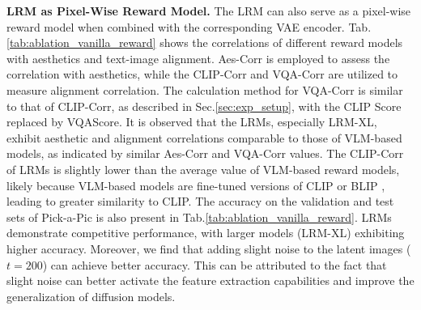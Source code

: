 \textbf{LRM as Pixel-Wise Reward Model.} The LRM can also serve as a pixel-wise reward model when combined with the corresponding VAE encoder. Tab.\;\ref{tab:ablation_vanilla_reward} shows the correlations of different reward models with aesthetics and text-image alignment. Aes-Corr is employed to assess the correlation with aesthetics, while the CLIP-Corr and VQA-Corr are utilized to measure alignment correlation. The calculation method for VQA-Corr is similar to that of CLIP-Corr, as described in Sec.\;\ref{sec:exp_setup}, with the CLIP Score replaced by VQAScore. It is observed that the LRMs, especially LRM-XL, exhibit aesthetic and alignment correlations comparable to those of VLM-based models, as indicated by similar Aes-Corr and VQA-Corr values. The CLIP-Corr of LRMs is slightly lower than the average value of VLM-based reward models, likely because  VLM-based models are fine-tuned versions of CLIP \cite{clip} or BLIP \cite{blip}, leading to greater similarity to CLIP. The accuracy on the validation and test sets of Pick-a-Pic is also present in Tab.\;\ref{tab:ablation_vanilla_reward}. LRMs demonstrate competitive performance, with larger models (LRM-XL) exhibiting higher accuracy. Moreover, we find that adding slight noise to the latent images ($t=200$) can achieve better accuracy. This can be attributed to the fact that slight noise can better activate the feature extraction capabilities and improve the generalization of diffusion models.

\begin{table}[ht]
    \centering
    \vspace{-2.5mm}
    \caption{Ablataion results on the hyperparamter $\beta$.}
    \vskip 0.05in
    \label{tab:ablation_beta}
    \footnotesize
\end{table}

